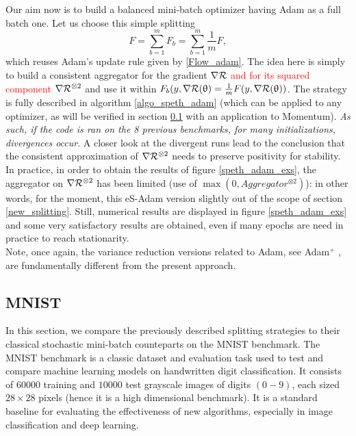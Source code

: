 \documentclass[article,authoryear,jmlmc]{beg_32}             %
\begin{document}
Our aim now is to build a balanced mini-batch optimizer having Adam as a full batch one. 
Let us choose this simple splitting
$$
F = \sum_{b=1}^m F_b = \sum_{b=1}^m \frac{1}{m}F,
$$
which reuses Adam's update rule given by \eqref{Flow_adam}. 
The idea here is simply to build a consistent aggregator for the gradient $\nabla \mathcal{R}$ \textcolor{red}{and for its squared component $\nabla \mathcal{R}^{\otimes 2}$} 
and use it within $F_b(y,\nabla \mathcal{R}(\uptheta)=\frac{1}{m}F(y,\nabla \mathcal{R}(\uptheta))$. 
The strategy is fully described in algorithm \ref{algo_speth_adam} (which can be applied to any optimizer, as will be verified in section \ref{s_mnist} with an application to Momentum).
{\em As such, if the code is ran on the 8 previous benchmarks, for many initializations, divergences occur}. 
A closer look at the divergent runs lead to the conclusion that the consistent approximation of $\nabla \mathcal{R}^{\otimes 2}$ needs to preserve positivity for stability. 
In practice, in order to obtain the results of figure \ref{speth_adam_exs}, the aggregator on $\nabla \mathcal{R}^{\otimes 2}$ has been limited (use of $\max(0, Aggregator^{\otimes 2})$): in
other words, for the moment, this eS-Adam version slightly out of the scope of section \ref{new_splitting}. Still, numerical results are displayed in figure
\ref{speth_adam_exs} and some very satisfactory results are obtained, even if many epochs are need in practice to reach stationarity. \\ 

        Note, once again, the variance reduction versions related to Adam, see Adam$^+$ \cite{adam_variance1}, are fundamentally different from the present approach.

\subsection{MNIST}
\label{s_mnist}

In this section, we compare the previously described splitting strategies to their classical stochastic mini-batch counteparts on the MNIST benchmark. 
The MNIST benchmark is a classic dataset and evaluation task used to test and compare machine learning models on handwritten digit classification. 
It consists of $60000$ training and $10000$ test grayscale images of digits $(0-9)$, each sized $28\times 28$ pixels (hence it is a high dimensional benchmark). 
It is a standard baseline for evaluating the effectiveness of new algorithms, especially in image classification and deep learning.
\end{document}

